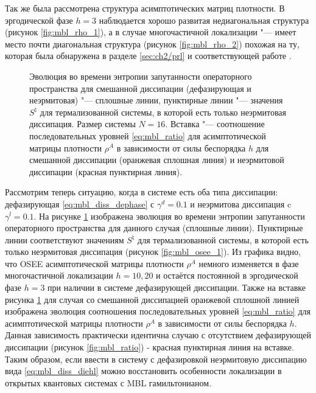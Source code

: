 Так же была рассмотрена структура асимптотических матриц плотности.
В эргодической фазе \(h=3\) наблюдается хорошо развитая недиагональная структура (рисунок \cref{fig:mbl_rho_1}), а в случае многочастичной локализации "--- имеет место почти диагональная структура (рисунок \cref{fig:mbl_rho_2}) похожая на ту, которая была обнаружена в разделе \cref{sec:ch2/prl} и соответствующей работе \cite{Yusipov2017}.

\begin{figure}[h]
	\caption[Эволюция во времени энтропии запутанности операторного пространства и зависимость соотношения последовательных уровней асимптотической матрицы плотности от силы беспорядка для смешанной диссипации (дефазирующая и неэрмитовая)]{
		Эволюция во времени энтропии запутанности операторного пространства для смешанной диссипации (дефазирующая и неэрмитовая) "--- сплошные линии, пунктирные линии "--- значения \(S^\natural\) для термализованной системы, в которой есть только неэрмитовая диссипация. Размер системы \(N=16\). Вставка "--- 
		соотношение последовательных уровней \cref{eq:mbl_ratio} для асимптотической матрицы плотности \(\rho^A\) в зависимости от силы беспорядка \(h\) для смешанной диссипации (оранжевая сплошная линия) и неэрмитовой диссипации (красная пунктирная линия).
	}
	\label{fig:mbl_both_diss}
\end{figure}

Рассмотрим теперь ситуацию, когда в системе есть оба типа диссипации: дефазирующая \cref{eq:mbl_diss_dephase} с \(\gamma^d = 0.1\) и неэрмитова диссипация c \(\gamma^l = 0.1\). 
На рисунке \cref{fig:mbl_both_diss} изображена эволюция во времени энтропии запутанности операторного пространства для данного случая (сплошные линии). Пунктирные линии соответствуют значениям \(S^\natural\) для термализованной системы, в которой есть только неэрмитовая диссипация (рисунок \cref{fig:mbl_osee_1}). 
Из графика видно, что OSEE асимптотической матрицы плотности \(\rho^A\) немного изменяется в фазе многочастичной локализации \(h=10, 20\) и остаётся постоянной в эргодической фазе \(h=3\) при наличии в системе дефазирующей диссипации. 
Также на вставке рисунка \cref{fig:mbl_both_diss} для случая со смешанной диссипацией оранжевой сплошной линией изображена эволюция соотношения последовательных уровней \cref{eq:mbl_ratio} для асимптотической матрицы плотности \(\rho^A\) в зависимости от силы беспорядка \(h\). 
Данная зависимость практически идентична случаю с отсутствием дефазирующей диссипации (рисунок \cref{fig:mbl_ratio}) - красная пунктирная линия на вставке.
Таким образом, если ввести в систему с дефазировкой неэрмитовую диссипацию вида \cref{eq:mbl_diss_diehl} можно восстановить особенности локализации в открытых квантовых системах с MBL гамильтонианом.

